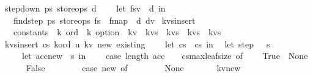 \begin{isabellebody}
{\isachardoublequoteopen}step{\isacharunderscore}down\ ps{}\ store{\isacharunderscore}ops\ d\ {\isacharequal}\ {\isacharparenleft}\isanewline
\ \ let\ {\isacharparenleft}fs{\isacharcomma}v{\isacharparenright}\ {\isacharequal}\ d\ in\isanewline
\ \ find{\isacharunderscore}step\ ps{}\ store{\isacharunderscore}ops\ fs\ {\isacharbar}{\isachargreater}\ fmap\ {\isacharparenleft}{\isacharpercent}\ d{\isacharprime}{\isachardot}\ {\isacharparenleft}d{\isacharprime}{\isacharcomma}v{\isacharparenright}{\isacharparenright}\isanewline
{\isacharparenright}{\isachardoublequoteclose}\isanewline
\isanewline
\isanewline
{}\isamarkupfalse%
\ kvs{\isacharunderscore}insert{\isacharunderscore}{}\ {\isacharcolon}{\isacharcolon}\ \isanewline
\ \ {\isachardoublequoteopen}constants\ {\isasymRightarrow}\ {\isacharprime}k\ ord\ {\isasymRightarrow}\ {\isacharprime}k\ option\ {\isasymRightarrow}\ {\isacharparenleft}{\isacharprime}k{\isacharasterisk}{\isacharprime}v{\isacharparenright}\ {\isasymRightarrow}\ {\isacharparenleft}{\isacharprime}k{\isacharasterisk}{\isacharprime}v{\isacharparenright}s\ {\isasymRightarrow}\ {\isacharparenleft}{\isacharprime}k{\isacharasterisk}{\isacharprime}v{\isacharparenright}s\ {\isasymRightarrow}\ {\isacharparenleft}{\isacharprime}k{\isacharasterisk}{\isacharprime}v{\isacharparenright}s\ {\isacharasterisk}\ {\isacharparenleft}{\isacharprime}k{\isacharasterisk}{\isacharprime}v{\isacharparenright}s{\isachardoublequoteclose}\ \isanewline
{}\isanewline
{\isachardoublequoteopen}kvs{\isacharunderscore}insert{\isacharunderscore}{}\ cs{\isacharprime}\ k{\isacharunderscore}ord\ u\ kv\ new\ existing\ {\isacharequal}\ {\isacharparenleft}\isanewline
\ \ let\ cs\ {\isacharequal}\ cs{\isacharprime}\ in\isanewline
\ \ let\ step\ {\isacharequal}\ {\isacharparenleft}{\isacharpercent}\ s{\isachardot}\ \isanewline
\ \ \ \ let\ {\isacharparenleft}acc{\isacharcomma}new{\isacharprime}{\isacharparenright}\ {\isacharequal}\ s\ in\isanewline
\ \ \ \ case\ {\isacharparenleft}length\ acc\ {\isasymge}\ {}\ {\isacharasterisk}\ cs{\isacharbar}{\isachargreater}max{\isacharunderscore}leaf{\isacharunderscore}size{\isacharparenright}\ of\isanewline
\ \ \ \ True\ {\isasymRightarrow}\ None\isanewline
\ \ \ \ {\isacharbar}\ False\ {\isasymRightarrow}\ {\isacharparenleft}\isanewline
\ \ \ \ \ \ case\ new{\isacharprime}\ of\isanewline
\ \ \ \ \ \ {\isacharbrackleft}{\isacharbrackright}\ {\isasymRightarrow}\ None\isanewline
\ \ \ \ \ \ {\isacharbar}\ {\isacharparenleft}k{\isacharcomma}v{\isacharparenright}{\isacharhash}new{\isacharprime}{\isacharprime}\ {\isasymRightarrow}\ {\isacharparenleft}\isanewline

\end{isabellebody}
